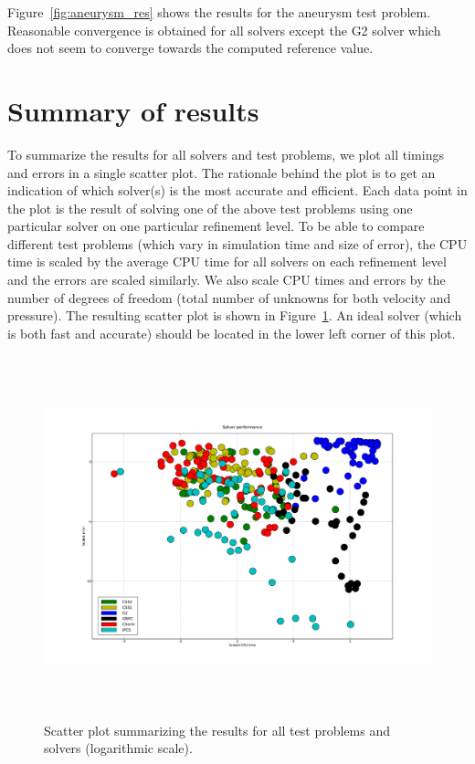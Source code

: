 Figure~\ref{fig:aneurysm_res} shows the results for the aneurysm test
problem. Reasonable convergence is obtained for all solvers except the
G2 solver which does not seem to converge towards the computed
reference value.

\section{Summary of results}

To summarize the results for all solvers and test problems, we plot
all timings and errors in a single scatter plot. The rationale behind
the plot is to get an indication of which solver(s) is the most
accurate and efficient. Each data point in the plot is the result of
solving one of the above test problems using one particular solver on
one particular refinement level. To be able to compare different test
problems (which vary in simulation time and size of error), the CPU
time is scaled by the average CPU time for all solvers on each
refinement level and the errors are scaled similarly. We also scale
CPU times and errors by the number of degrees of freedom (total number
of unknowns for both velocity and pressure). The resulting scatter
plot is shown in Figure~\ref{fig:scatter}. An ideal solver (which is
both fast and accurate) should be located in the lower left corner of
this plot.

\begin{figure}
  \vspace{0.3cm}
  \hspace{-2cm}
  \includegraphics[width=20cm,height=10.5cm,keepaspectratio=false]{chapters/kvs-1/pdf/new_scatter.pdf}
  \caption{Scatter plot summarizing the results for all test problems
    and solvers (logarithmic scale).}
  \label{fig:scatter}
\end{figure}

